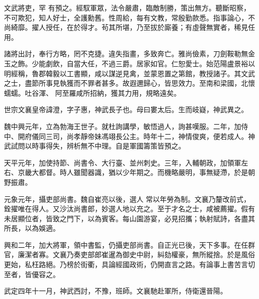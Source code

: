 \begin{pinyinscope}
 文武將吏，罕
 有預之。經馭軍眾，法令嚴肅，臨敵制勝，策出無方。聽斷昭察，不可欺犯，知人好士，全護勳舊。性周給，每有文教，常殷勤款悉。指事論心，不尚綺靡。擢人授任，在於得才。茍其所堪，乃至拔於廝養；有虛聲無實者，稀見任用。



 諸將出討，奉行方略，罔不克捷。違失指畫，多致奔亡。雅尚儉素，刀劍鞍勒無金玉之飾。少能劇飲，自當大任，不過三爵。居家如官。仁恕愛士。始范陽盧景裕以明經稱，魯郡韓毅以工書顯，咸以謀逆見禽，並蒙恩置之第館，教授諸子。其文武之士，盡節所事見執獲而不罪者甚多。故遐邇歸心，皆思效力。至南和梁國，北懷蠕蠕。吐谷渾、
 阿至羅咸所招納，獲其力用，規略遠矣。



 世宗文襄皇帝諱澄，字子惠，神武長子也。母曰婁太后。生而岐嶷，神武異之。



 魏中興元年，立為勃海王世子。就杜詢講學，敏悟過人，詢甚嘆服。二年，加侍中、開府儀同三司，尚孝靜帝妹馮翊長公主。時年十二，神情俊爽，便若成人。神武試問以時事得失，辨析無不中理。自是軍國籌策皆預之。



 天平元年，加使持節、尚書令、大行臺、並州刺史。三年，入輔朝政，加領軍左右、京畿大都督。時人雖聞器識，猶以少年期之。而機略嚴明，事無疑滯，於是朝野振肅。



 元象元年，攝吏部尚書。魏自崔亮以後，選人
 常以年勞為制。文襄乃釐改前式，銓擢唯在得人。又沙汰尚書郎，妙選人地以充之。至于才名之士，咸被薦擢。假有未居顯位者，皆致之門下，以為賓客。每山園游宴，必見招攜；執射賦詩，各盡其所長，以為娛適。



 興和二年，加大將軍，領中書監，仍攝吏部尚書。自正光已後，天下多事。在任群官，廉潔者寡。文襄乃奏吏部郎崔暹為御史中尉，糾劾權豪，無所縱捨。於是風俗更始，私枉路絕。乃榜於街衢，具論經國政術，仍開直言之路。有論事上書苦言切至者，皆優容之。



 武定四年十一月，神武西討，不豫，班師。文襄馳赴軍所，侍衛還晉陽。




\end{pinyinscope}
